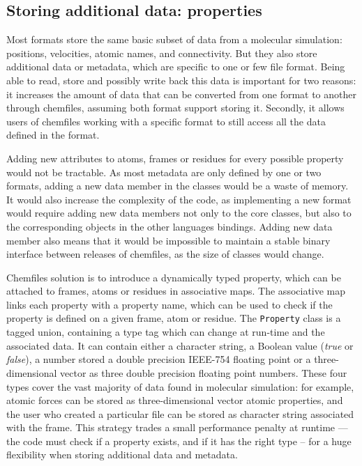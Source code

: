 \documentclass[thesis]{subfiles}
\begin{document}
\subsection{Storing additional data: properties}

Most formats store the same basic subset of data from a molecular simulation:
positions, velocities, atomic names, and connectivity. But they also store
additional data or metadata, which are specific to one or few file format. Being
able to read, store and possibly write back this data is important for two
reasons: it increases the amount of data that can be converted from one format
to another through chemfiles, assuming both format support storing it. Secondly,
it allows users of chemfiles working with a specific format to still access all
the data defined in the format.

Adding new attributes to atoms, frames or residues for every possible property
would not be tractable. As most metadata are only defined by one or two
formats, adding a new data member in the classes would be a waste of memory. It
would also increase the complexity of the code, as implementing a new format
would require adding new data members not only to the core \cxx classes, but
also to the corresponding objects in the other languages bindings. Adding new
data member also means that it would be impossible to maintain a stable binary
interface between releases of chemfiles, as the size of classes would change.

Chemfiles solution is to introduce a dynamically typed property, which can be
attached to frames, atoms or residues in associative maps. The associative map
links each property with a property name, which can be used to check if the
property is defined on a given frame, atom or residue. The \texttt{Property}
class is a tagged union, containing a type tag which can change at run-time and
the associated data. It can contain either a character string, a Boolean value
(\emph{true} or \emph{false}), a number stored a double precision IEEE-754
floating point or a three-dimensional vector as three double precision floating
point numbers. These four types cover the vast majority of data found in
molecular simulation: for example, atomic forces can be stored as
three-dimensional vector atomic properties, and the user who created a
particular file can be stored as character string associated with the frame.
This strategy trades a small performance penalty at runtime --- the code must
check if a property exists, and if it has the right type -- for a huge
flexibility when storing additional data and metadata.
\end{document}

